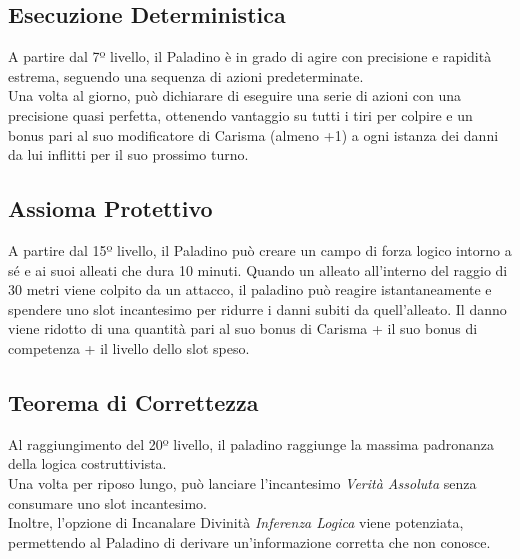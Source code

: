 \subsection{Esecuzione Deterministica}
A partire dal 7º livello, il Paladino è in grado di agire con precisione e rapidità estrema, seguendo una sequenza di azioni predeterminate. \\ Una volta al giorno, può dichiarare di eseguire una serie di azioni con una precisione quasi perfetta, ottenendo vantaggio su tutti i tiri per colpire e un bonus pari al suo modificatore di Carisma (almeno +1) a ogni istanza dei danni da lui inflitti per il suo prossimo turno.

\subsection{Assioma Protettivo}
A partire dal 15º livello, il Paladino può creare un campo di forza logico intorno a sé e ai suoi alleati che dura 10 minuti. Quando un alleato all'interno del raggio di 30 metri viene colpito da un attacco, il paladino può reagire istantaneamente e spendere uno slot incantesimo per ridurre i danni subiti da quell'alleato. Il danno viene ridotto di una quantità pari al suo bonus di Carisma + il suo bonus di competenza + il livello dello slot speso.

\subsection{Teorema di Correttezza}
Al raggiungimento del 20º livello, il paladino raggiunge la massima padronanza della logica costruttivista. \\ Una volta per riposo lungo, può lanciare l'incantesimo \textit{Verità Assoluta} senza consumare uno slot incantesimo. \\ Inoltre, l'opzione di Incanalare Divinità \textit{Inferenza Logica} viene potenziata, permettendo al Paladino di derivare un'informazione corretta che non conosce.